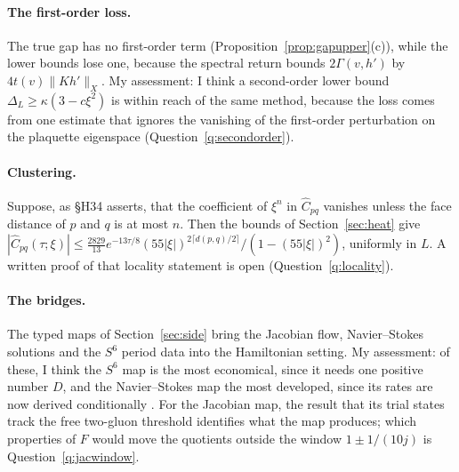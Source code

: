 \paragraph{The first-order loss.}
The true gap has no first-order term (Proposition~\ref{prop:gapupper}(c)), while the lower bounds lose one, because the spectral return bounds $2\Gamma(v,h')$ by $4t(v)\|Kh'\|_X$.
My assessment: I think a second-order lower bound $\Delta_L\ge\kappa(3-c\xi^2)$ is within reach of the same method, because the loss comes from one estimate that ignores the vanishing of the first-order perturbation on the plaquette eigenspace (Question~\ref{q:secondorder}).

\paragraph{Clustering.}
Suppose, as §H34 asserts, that the coefficient of $\xi^n$ in $\widehat C_{pq}$ vanishes unless the face distance of $p$ and $q$ is at most $n$. Then the bounds of Section~\ref{sec:heat} give $|\widehat C_{pq}(\tau;\xi)|\le\frac{2829}{13}e^{-13\tau/8}(55|\xi|)^{2\lceil d(p,q)/2\rceil}/(1-(55|\xi|)^2)$, uniformly in $L$. A written proof of that locality statement is open (Question~\ref{q:locality}).

\paragraph{The bridges.}
The typed maps of Section~\ref{sec:side} bring the Jacobian flow, Navier--Stokes solutions and the $S^6$ period data into the Hamiltonian setting.
My assessment: of these, I think the $S^6$ map is the most economical, since it needs one positive number $D$, and the Navier--Stokes map the most developed, since its rates are now derived conditionally \cite{NSPaper}. For the Jacobian map, the result that its trial states track the free two-gluon threshold identifies what the map produces; which properties of $F$ would move the quotients outside the window $1\pm1/(10j)$ is Question~\ref{q:jacwindow}.
